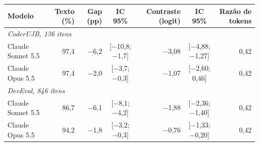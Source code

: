 \begin{tabular}{lrrcrcr}
\toprule
Modelo & Texto (\%) & Gap (pp) & IC 95\% & Contraste (logit) & IC 95\% & Razão de tokens \\
\midrule
\multicolumn{7}{l}{\emph{CoderUJB, 136 itens}} \\
Claude Sonnet 5.5 & 97,4 & \ensuremath{-}6,2 & [\ensuremath{-}10,8; \ensuremath{-}1,7] & \ensuremath{-}3,08 & [\ensuremath{-}4,88; \ensuremath{-}1,27] & 0,42 \\
Claude Opus 5.5 & 97,4 & \ensuremath{-}2,0 & [\ensuremath{-}3,7; \ensuremath{-}0,3] & \ensuremath{-}1,07 & [\ensuremath{-}2,60; 0,46] & 0,42 \\
\midrule
\multicolumn{7}{l}{\emph{DevEval, 846 itens}} \\
Claude Sonnet 5.5 & 86,7 & \ensuremath{-}6,1 & [\ensuremath{-}8,1; \ensuremath{-}4,2] & \ensuremath{-}1,88 & [\ensuremath{-}2,36; \ensuremath{-}1,40] & 0,42 \\
Claude Opus 5.5 & 94,2 & \ensuremath{-}1,8 & [\ensuremath{-}3,2; \ensuremath{-}0,3] & \ensuremath{-}0,76 & [\ensuremath{-}1,33; \ensuremath{-}0,20] & 0,42 \\
\bottomrule
\end{tabular}
